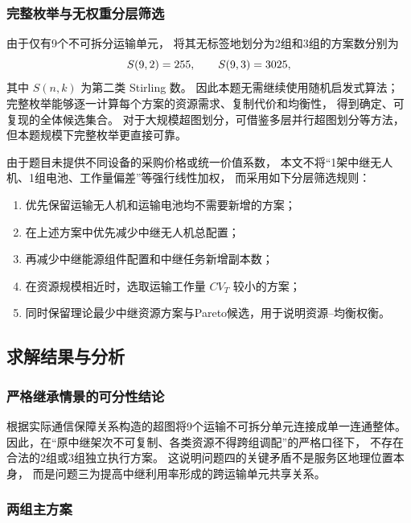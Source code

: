\subsubsection{完整枚举与无权重分层筛选}

由于仅有9个不可拆分运输单元，
将其无标签地划分为2组和3组的方案数分别为
\begin{equation}
 S(9,2)=255,
 \qquad
 S(9,3)=3025,
 \label{eq:q4-stirling}
\end{equation}
其中 $S(n,k)$ 为第二类 Stirling 数。
因此本题无需继续使用随机启发式算法；
完整枚举能够逐一计算每个方案的资源需求、复制代价和均衡性，
得到确定、可复现的全体候选集合。
对于大规模超图划分，可借鉴多层并行超图划分等方法\cite{q4-krause2025}，
但本题规模下完整枚举更直接可靠。

由于题目未提供不同设备的采购价格或统一价值系数，
本文不将“1架中继无人机、1组电池、工作量偏差”等强行线性加权，
而采用如下分层筛选规则：
\begin{enumerate}[label=(\arabic*),leftmargin=3em]
    \item 优先保留运输无人机和运输电池均不需要新增的方案；
    \item 在上述方案中优先减少中继无人机总配置；
    \item 再减少中继能源组件配置和中继任务新增副本数；
    \item 在资源规模相近时，选取运输工作量 $CV_T$ 较小的方案；
    \item 同时保留理论最少中继资源方案与Pareto候选，用于说明资源--均衡权衡。
\end{enumerate}

\subsection{求解结果与分析}

\subsubsection{严格继承情景的可分性结论}

根据实际通信保障关系构造的超图将9个运输不可拆分单元连接成单一连通整体。
因此，在“原中继架次不可复制、各类资源不得跨组调配”的严格口径下，
不存在合法的2组或3组独立执行方案。
这说明问题四的关键矛盾不是服务区地理位置本身，
而是问题三为提高中继利用率形成的跨运输单元共享关系。

\subsubsection{两组主方案}

